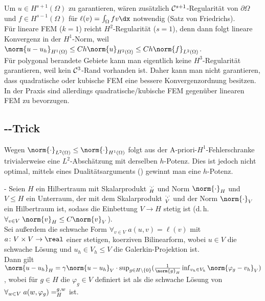 \linie

\begin{Bem}
    Um $u \in H^{s+1}(\Omega)$ zu garantieren, wären zusätzlich
    $\mathcal{C}^{s+1}$-Regularität von $\partial\Omega$ und $f \in H^{s-1}(\Omega)$ für
    $\ell(v) = \int_\Omega fv \dx$ notwendig (Satz von Friedrichs).\\
    Für lineare FEM ($k = 1$) reicht $H^2$-Regularität ($s = 1$),
    denn dann folgt lineare Konvergenz in der $H^1$-Norm, weil
    $\norm{u - u_h}_{H^1(\Omega)} \le Ch\norm{u}_{H^2(\Omega)} \le Ch\norm{f}_{L^2(\Omega)}$.\\
    Für polygonal berandete Gebiete kann man eigentlich keine $H^3$-Regularität garantieren,
    weil kein $\mathcal{C}^3$-Rand vorhanden ist.
    Daher kann man nicht garantieren, dass quadratische oder kubische FEM eine bessere
    Konvergenzordnung besitzen.
    In der Praxis sind allerdings quadratische/kubische FEM gegenüber linearen FEM
    zu bevorzugen.
\end{Bem}

\subsection{%
    --Trick%
}

\begin{Bem}
    Wegen $\norm{\cdot}_{L^2(\Omega)} \le \norm{\cdot}_{H^1(\Omega)}$
    folgt aus der A-priori-$H^1$-Fehlerschranke trivialerweise eine $L^2$-Abschätzung
    mit derselben $h$-Potenz.
    Dies ist jedoch nicht optimal, mittels eines Dualitätsarguments
    () gewinnt man eine $h$-Potenz.
\end{Bem}

\begin{Satz}{-}
    Seien $H$ ein Hilbertraum mit Skalarprodukt $\sp{\cdot, \cdot}_H$ und Norm $\norm{\cdot}_H$
    und $V \le H$ ein Unterraum, der mit dem Skalarprodukt
    $\sp{\cdot, \cdot}_V$ und der Norm $\norm{\cdot}_V$ ein Hilbertraum ist,
    sodass die Einbettung $V \to H$ stetig ist
    (d.\,h. $\forall_{v \in V}\; \norm{v}_H \le C \norm{v}_V$).\\
    Sei außerdem die schwache Form $\forall_{v \in V}\; a(u, v) = \ell(v)$
    mit $a\colon V \times V \to \real$ einer stetigen, koerziven Bilinearform,
    wobei $u \in V$ die schwache Lösung und $u_h \in V_h \le V$
    die Galerkin-Projektion ist.\\
    Dann gilt $\norm{u - u_h}_H = \gamma \norm{u - u_h}_V \cdot
    \sup_{g \in H \setminus \{0\}} (\frac{1}{\norm{g}_H} \inf_{v_h \in V_h}
    \norm{\varphi_g - v_h}_V)$,
    wobei für $g \in H$ die  $\varphi_g \in V$ definiert ist als
    die schwache Lösung von $\forall_{w \in V}\; a(w, \varphi_g) = \sp{g, w}_H$ ist.
\end{Satz}

